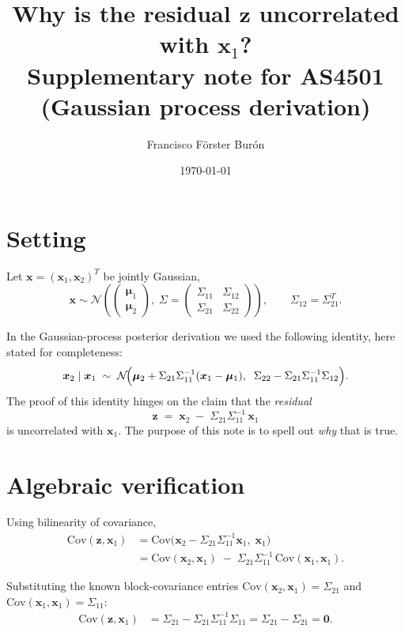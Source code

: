 \documentclass[11pt]{article}
\title{Why is the residual $\bm{z}$ uncorrelated with $\bm{x}_1$?\\
       \large Supplementary note for AS4501 (Gaussian process derivation)}
\author{Francisco F\"orster Bur\'on}
\date{\today}
\begin{document}
\maketitle

\section*{Setting}

Let $\bm{x} = (\bm{x}_1, \bm{x}_2)^T$ be jointly Gaussian,
\[
  \bm{x} \sim \mathcal{N}\!\left(
    \begin{pmatrix} \bm{\mu}_1 \\ \bm{\mu}_2 \end{pmatrix},
    \;
    \Sigma = \begin{pmatrix} \Sigma_{11} & \Sigma_{12} \\ \Sigma_{21} & \Sigma_{22} \end{pmatrix}
  \right),
  \qquad \Sigma_{12} = \Sigma_{21}^T.
\]

In the Gaussian-process posterior derivation we used the following
identity, here stated for completeness:
\[
  \bm{x}_2 \mid \bm{x}_1 \;\sim\; \mathcal{N}\!\Bigl(
     \bm{\mu}_2 + \Sigma_{21}\Sigma_{11}^{-1}(\bm{x}_1 - \bm{\mu}_1), \;\;
     \Sigma_{22} - \Sigma_{21}\Sigma_{11}^{-1}\Sigma_{12}
  \Bigr).
\]
The proof of this identity hinges on the claim that the
\emph{residual}
\begin{equation}\label{eq:zdef}
  \bm{z} \;=\; \bm{x}_2 \;-\; \Sigma_{21}\Sigma_{11}^{-1}\,\bm{x}_1
\end{equation}
is uncorrelated with $\bm{x}_1$. The purpose of this note is to spell
out \emph{why} that is true.

\section*{Algebraic verification}

Using bilinearity of covariance,
\begin{align}
  \mathrm{Cov}(\bm{z}, \bm{x}_1)
  &= \mathrm{Cov}\bigl(\bm{x}_2 - \Sigma_{21}\Sigma_{11}^{-1}\bm{x}_1,\; \bm{x}_1\bigr) \\
  &= \mathrm{Cov}(\bm{x}_2, \bm{x}_1) \;-\; \Sigma_{21}\Sigma_{11}^{-1}\,\mathrm{Cov}(\bm{x}_1, \bm{x}_1).
\end{align}

Substituting the known block-covariance entries
$\mathrm{Cov}(\bm{x}_2, \bm{x}_1) = \Sigma_{21}$ and
$\mathrm{Cov}(\bm{x}_1, \bm{x}_1) = \Sigma_{11}$:
\begin{align}
  \mathrm{Cov}(\bm{z}, \bm{x}_1)
  &= \Sigma_{21} - \Sigma_{21}\Sigma_{11}^{-1}\Sigma_{11}
   = \Sigma_{21} - \Sigma_{21}
   = \bm{0}.
\end{align}
\end{document}
